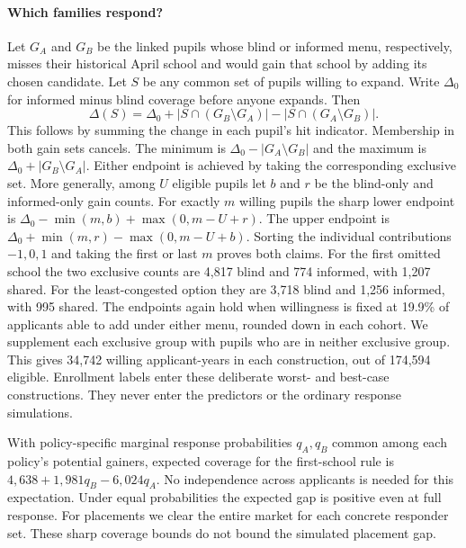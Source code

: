 \paragraph{Which families respond?}
Let $G_A$ and $G_B$ be the linked pupils whose blind or informed menu, respectively, misses their historical April school and would gain that school by adding its chosen candidate. Let $S$ be any common set of pupils willing to expand. Write $\Delta_0$ for informed minus blind coverage before anyone expands. Then
\[
  \Delta(S)=\Delta_0+|S\cap(G_B\setminus G_A)|-|S\cap(G_A\setminus G_B)|.
\]
This follows by summing the change in each pupil's hit indicator. Membership in both gain sets cancels. The minimum is $\Delta_0-|G_A\setminus G_B|$ and the maximum is $\Delta_0+|G_B\setminus G_A|$. Either endpoint is achieved by taking the corresponding exclusive set. More generally, among $U$ eligible pupils let $b$ and $r$ be the blind-only and informed-only gain counts. For exactly $m$ willing pupils the sharp lower endpoint is $\Delta_0-\min(m,b)+\max(0,m-U+r)$. The upper endpoint is $\Delta_0+\min(m,r)-\max(0,m-U+b)$. Sorting the individual contributions $-1,0,1$ and taking the first or last $m$ proves both claims. For the first omitted school the two exclusive counts are 4,817 blind and 774 informed, with 1,207 shared. For the least-congested option they are 3,718 blind and 1,256 informed, with 995 shared. The endpoints again hold when willingness is fixed at 19.9\% of applicants able to add under either menu, rounded down in each cohort. We supplement each exclusive group with pupils who are in neither exclusive group. This gives 34,742 willing applicant-years in each construction, out of 174,594 eligible. Enrollment labels enter these deliberate worst- and best-case constructions. They never enter the predictors or the ordinary response simulations.

With policy-specific marginal response probabilities $q_A,q_B$ common among each policy's potential gainers, expected coverage for the first-school rule is $4{,}638+1{,}981q_B-6{,}024q_A$. No independence across applicants is needed for this expectation. Under equal probabilities the expected gap is positive even at full response. For placements we clear the entire market for each concrete responder set. These sharp coverage bounds do not bound the simulated placement gap.

